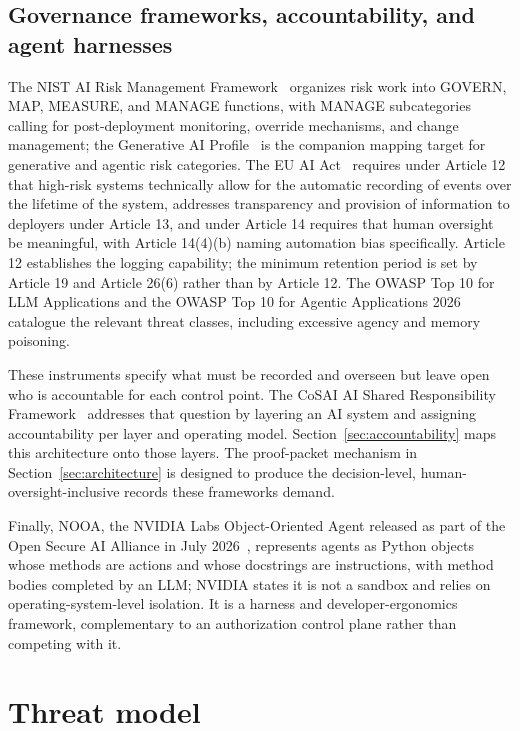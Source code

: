 \documentclass[11pt,letterpaper]{article}
\begin{document}
\subsection{Governance frameworks, accountability, and agent harnesses}\label{sec:related-governance}

The NIST AI Risk Management Framework~\cite{nistairmf} organizes risk work into GOVERN, MAP, MEASURE, and MANAGE functions, with MANAGE subcategories calling for post-deployment monitoring, override mechanisms, and change management; the Generative AI Profile~\cite{nist600} is the companion mapping target for generative and agentic risk categories. The EU AI Act~\cite{euaiact} requires under Article 12 that high-risk systems technically allow for the automatic recording of events over the lifetime of the system, addresses transparency and provision of information to deployers under Article 13, and under Article 14 requires that human oversight be meaningful, with Article 14(4)(b) naming automation bias specifically. Article 12 establishes the logging capability; the minimum retention period is set by Article 19 and Article 26(6) rather than by Article 12. The OWASP Top 10 for LLM Applications and the OWASP Top 10 for Agentic Applications 2026~\cite{owasp} catalogue the relevant threat classes, including excessive agency and memory poisoning.

These instruments specify what must be recorded and overseen but leave open who is accountable for each control point. The CoSAI AI Shared Responsibility Framework~\cite{cosaisrf} addresses that question by layering an AI system and assigning accountability per layer and operating model. Section~\ref{sec:accountability} maps this architecture onto those layers. The proof-packet mechanism in Section~\ref{sec:architecture} is designed to produce the decision-level, human-oversight-inclusive records these frameworks demand.

Finally, NOOA, the NVIDIA Labs Object-Oriented Agent released as part of the Open Secure AI Alliance in July 2026~\cite{nooa2026}, represents agents as Python objects whose methods are actions and whose docstrings are instructions, with method bodies completed by an LLM; NVIDIA states it is not a sandbox and relies on operating-system-level isolation. It is a harness and developer-ergonomics framework, complementary to an authorization control plane rather than competing with it.

\section{Threat model}\label{sec:threat}
\end{document}
